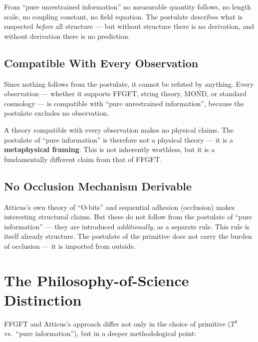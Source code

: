 From ``pure unrestrained information'' no measurable quantity follows, no length scale, no coupling constant, no field equation. The postulate describes what is suspected \emph{before} all structure --- but without structure there is no derivation, and without derivation there is no prediction.

\subsection{Compatible With Every Observation}

Since nothing follows from the postulate, it cannot be refuted by anything. Every observation --- whether it supports FFGFT, string theory, MOND, or standard cosmology --- is compatible with ``pure unrestrained information'', because the postulate excludes no observation.

\begin{wichtig}[Not Falsifiable = Not Physical]
A theory compatible with every observation makes no physical claims. The postulate of ``pure information'' is therefore not a physical theory --- it is a \textbf{metaphysical framing}. This is not inherently worthless, but it is a fundamentally different claim from that of FFGFT.
\end{wichtig}

\subsection{No Occlusion Mechanism Derivable}

Atticus's own theory of ``O-bits'' and sequential adhesion (occlusion) makes interesting structural claims. But these do not follow from the postulate of ``pure information'' --- they are introduced \emph{additionally}, as a separate rule. This rule is itself already structure. The postulate of the primitive does not carry the burden of occlusion --- it is imported from outside.

\section{The Philosophy-of-Science Distinction}

FFGFT and Atticus's approach differ not only in the choice of primitive ($T^4$ vs.\ ``pure information''), but in a deeper methodological point:

